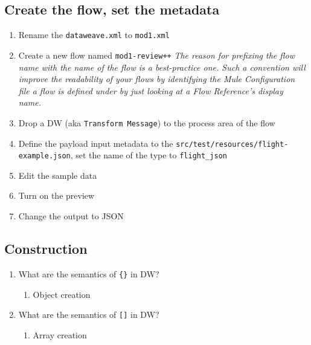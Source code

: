 \subsection{Create the flow, set the metadata}
\begin{enumerate}
\item Rename the \texttt{dataweave.xml} to \texttt{mod1.xml}
\item Create a new flow named \texttt{mod1-review++}
  \newline
  \emph{
    The reason for prefixing the flow name with the name of the flow is a best-practice one.
    Such a convention will improve the readability of your flows by identifying the
    Mule Configuration file a flow is defined under by just looking at a Flow Reference's
    display name.
  }
\item Drop a DW (aka \texttt{Transform Message}) to the process area of the flow
\item Define the payload input metadata to the \texttt{src/test/resources/flight-example.json},
  set the name of the type to \texttt{flight\_json}
\item Edit the sample data
\item Turn on the preview
\item Change the output to JSON
\end{enumerate}

\subsection{Construction}
\begin{enumerate}[resume*]
\item What are the semantics of \texttt{\{\}} in DW?
  \begin{enumerate}
  \item Object creation
  \end{enumerate}
\item What are the semantics of \texttt{[]} in DW?
  \begin{enumerate}
  \item Array creation
  \end{enumerate}
\end{enumerate}

